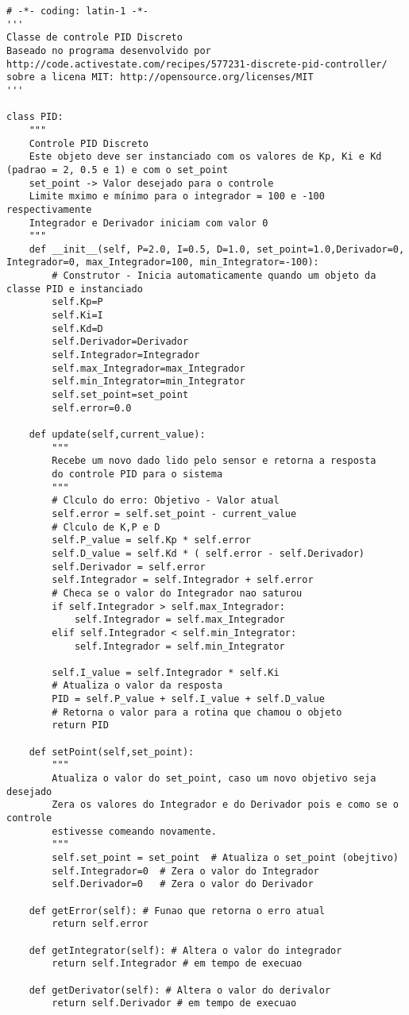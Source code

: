 \lstset{language=Python}
\begin{lstlisting}
# -*- coding: latin-1 -*-
'''
Classe de controle PID Discreto
Baseado no programa desenvolvido por http://code.activestate.com/recipes/577231-discrete-pid-controller/
sobre a licena MIT: http://opensource.org/licenses/MIT
'''

class PID:
	"""
	Controle PID Discreto
	Este objeto deve ser instanciado com os valores de Kp, Ki e Kd (padrao = 2, 0.5 e 1) e com o set_point
	set_point -> Valor desejado para o controle
	Limite mximo e mínimo para o integrador = 100 e -100 respectivamente
	Integrador e Derivador iniciam com valor 0
	"""
	def __init__(self, P=2.0, I=0.5, D=1.0, set_point=1.0,Derivador=0, Integrador=0, max_Integrador=100, min_Integrator=-100):
		# Construtor - Inicia automaticamente quando um objeto da classe PID e instanciado
		self.Kp=P
		self.Ki=I
		self.Kd=D
		self.Derivador=Derivador
		self.Integrador=Integrador
		self.max_Integrador=max_Integrador
		self.min_Integrator=min_Integrator
		self.set_point=set_point
		self.error=0.0

	def update(self,current_value):
		"""
		Recebe um novo dado lido pelo sensor e retorna a resposta
		do controle PID para o sistema
		"""
		# Clculo do erro: Objetivo - Valor atual
		self.error = self.set_point - current_value
		# Clculo de K,P e D
		self.P_value = self.Kp * self.error
		self.D_value = self.Kd * ( self.error - self.Derivador)
		self.Derivador = self.error
		self.Integrador = self.Integrador + self.error
		# Checa se o valor do Integrador nao saturou
		if self.Integrador > self.max_Integrador:
			self.Integrador = self.max_Integrador
		elif self.Integrador < self.min_Integrator:
			self.Integrador = self.min_Integrator

		self.I_value = self.Integrador * self.Ki
		# Atualiza o valor da resposta 
		PID = self.P_value + self.I_value + self.D_value
		# Retorna o valor para a rotina que chamou o objeto
		return PID

	def setPoint(self,set_point):
		"""
		Atualiza o valor do set_point, caso um novo objetivo seja desejado
		Zera os valores do Integrador e do Derivador pois e como se o controle
		estivesse comeando novamente.
		"""
		self.set_point = set_point  # Atualiza o set_point (obejtivo)
		self.Integrador=0  # Zera o valor do Integrador
		self.Derivador=0   # Zera o valor do Derivador

	def getError(self): # Funao que retorna o erro atual
		return self.error

	def getIntegrator(self): # Altera o valor do integrador
		return self.Integrador # em tempo de execuao

	def getDerivator(self): # Altera o valor do derivalor
		return self.Derivador # em tempo de execuao

		
\end{lstlisting}